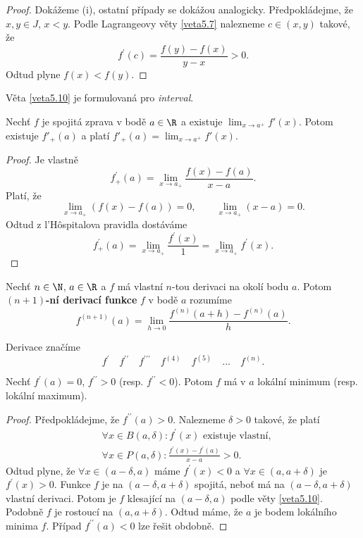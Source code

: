 \begin{proof}
Dokážeme (i), ostatní případy se dokážou analogicky.
	Předpokládejme, že $x,y\in J$, $x<y$. Podle Lagrangeovy věty \ref{veta5.7} nalezneme
	$c \in (x,y)$ takové, že
	$$
	    f^\prime(c) = \frac{f(y)-f(x)}{y-x}>0.
	$$
	Odtud plyne $f(x)<f(y)$.
\end{proof}

\begin{poznamka}[Varování!]
	Věta \ref{veta5.10} je formulovaná pro \emph{interval}.
\end{poznamka}

\begin{veta}\label{veta5.11}
Nechť $f$ je spojitá zprava v bodě $a\in\R$ a existuje $\displaystyle \lim_{x\to a^+} f'(x)$. Potom existuje $f'_+(a)$ a platí $f'_+(a)=\displaystyle \lim_{x\to a^+} f'(x)$.
\end{veta}

\begin{proof}
    Je vlastně
	$$
	f_+^\prime(a)=\lim_{x\to a_+} \frac{f(x)-f(a)}{x-a}.
	$$
	Platí, že
	$$
 \lim_{x\to a_+} (f(x)-f(a))=0, \qquad \lim_{x\to a_+} (x-a)=0.
	$$
	Odtud z l'H\^ospitalova pravidla dostáváme
	$$
	    f_+^\prime(a) = \lim_{x\to a_+} \frac{f^\prime(x)}{1}=\lim_{x\to a_+} f^\prime(x).
	$$
\end{proof}

\begin{definice}
Nechť $n\in\N$, $a\in\R$ a $f$ má vlastní $n$-tou derivaci na okolí bodu $a$. Potom \textbf{$(n+1)$-ní derivací funkce} $f$ v bodě $a$ rozumíme
\[
 f^{(n+1)}(a)=\lim_{h\to 0} \frac{f^{(n)}(a+h)-f^{(n)}(a)}{h}.
\]
\end{definice}

\begin{poznamka}
	Derivace značíme
	$$
	    f^\prime \quad f^{\prime\prime}\quad f^{\prime\prime\prime}\quad f^{(4)}\quad f^{(5)}\quad\dots\quad f^{(n)}.
	$$
\end{poznamka}

\begin{veta}\label{veta5.12}
	Nechť $f^\prime(a)=0$, $f^{\prime\prime}>0$ (resp. $f^{\prime\prime}<0$). Potom $f$ má v $a$ lokální minimum
	(resp. lokální maximum).
\end{veta}

\begin{proof}
	Předpokládejme, že $f^{\prime\prime}(a) > 0$. Nalezneme $\delta > 0$ takové, že platí
	\begin{align*}
	&\forall x \in B(a,\delta): f^\prime(x) \textrm{ existuje vlastní},\\
	&\forall x \in P(a,\delta): \frac{f^\prime(x)-f^\prime(a)}{x-a}>0.
	\end{align*}
    Odtud plyne, že $\forall x \in (a-\delta, a)$ máme $f^\prime(x) < 0$ a $\forall x \in (a,a+\delta)$ je $f^\prime(x)>0$.
    Funkce $f$ je na $(a-\delta, a+\delta)$ spojitá, neboť má na $(a-\delta, a+\delta)$ vlastní derivaci.
    Potom je $f$ klesající na $(a-\delta, a)$ podle věty \ref{veta5.10}. Podobně $f$ je rostoucí na $(a, a+\delta)$.
   Odtud máme, že $a$ je bodem lokálního minima $f$. Případ $f^{\prime\prime}(a) < 0$ lze řešit obdobně.
\end{proof}

